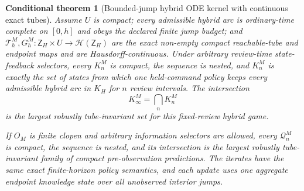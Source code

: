 \documentclass[11pt]{article}
\newtheorem{conditionaltheorem}{Conditional theorem}
\theoremstyle{definition}
\begin{document}
\begin{conditionaltheorem}[Bounded-jump hybrid ODE kernel with continuous exact tubes]
\label{thm:bounded-jump-hybrid-ode-kernel}
Assume $U$ is compact; every admissible hybrid arc is ordinary-time complete
on $[0,h]$ and obeys the declared finite jump budget; and
$\mathscr T_h^M,G_h^M:\mathsf Z_H\times U\to
\mathcal H(\mathsf Z_H)$ are the exact non-empty compact reachable-tube and
endpoint maps and are Hausdorff-continuous.  Under arbitrary review-time
state-feedback selectors, every $K_n^M$ is compact, the sequence is nested,
and $K_n^M$ is exactly the set of states from which one held-command policy
keeps every admissible hybrid arc in $K_H$ for $n$ review intervals.  The
intersection
\[
K_\infty^M=\bigcap_nK_n^M
\]
is the largest robustly tube-invariant set for this fixed-review hybrid
game.

If $O_M$ is finite clopen and arbitrary information selectors are allowed,
every $\mathcal Q_n^M$ is compact, the sequence is nested, and its
intersection is the largest robustly tube-invariant family of compact
pre-observation predictions.  The iterates have the same exact
finite-horizon policy semantics, and each update uses one aggregate endpoint
knowledge state over all unobserved interior jumps.
\end{conditionaltheorem}
\end{document}
